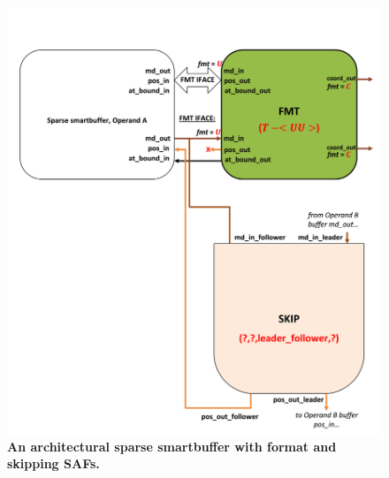 \begin{figure}[H]
\includegraphics[width=\textwidth]{figures/safinference_build_02fmtporttype.png}
\caption{\textbf{An architectural sparse smartbuffer with format and skipping SAFs.}}
\label{fig:safinference_build_02fmtporttype}
\centering
\end{figure}



